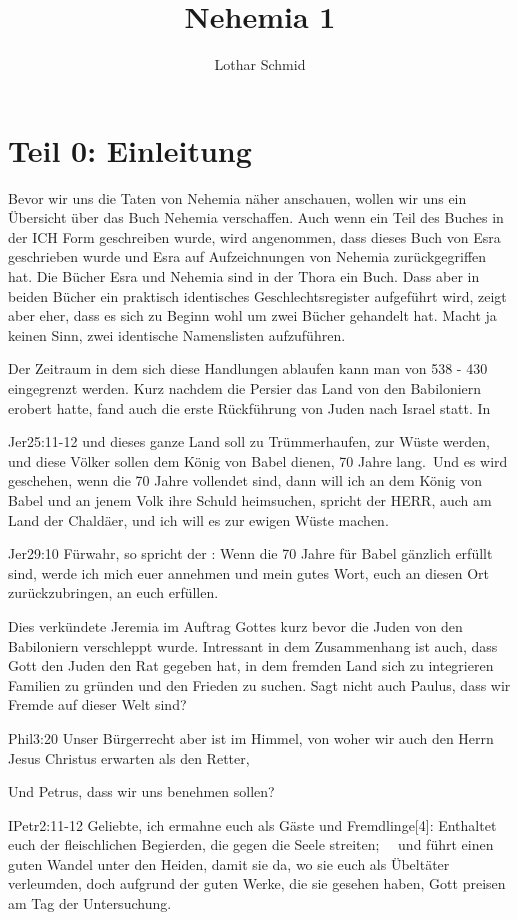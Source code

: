 \documentclass[fontsize=16pt]{mybib}
\title{Nehemia 1}
\author{Lothar Schmid}
\date{}
\begin{document}
\mytitlepage
\tableofcontents
\flushbottom
\newpage

\section{Teil 0: Einleitung}
Bevor wir uns die Taten von Nehemia näher anschauen, wollen wir uns ein Übersicht über das Buch Nehemia verschaffen. Auch wenn ein Teil des Buches in der ICH Form geschreiben wurde, wird angenommen, dass dieses Buch von Esra geschrieben wurde und Esra auf Aufzeichnungen von Nehemia zurückgegriffen hat. Die Bücher Esra und Nehemia sind in der Thora ein Buch. Dass aber in beiden Bücher ein praktisch identisches Geschlechtsregister aufgeführt wird, zeigt aber eher, dass es sich zu Beginn wohl um zwei Bücher gehandelt hat. Macht ja keinen Sinn, zwei identische Namenslisten aufzuführen.

Der Zeitraum in dem sich diese Handlungen ablaufen kann man von 538 - 430 \vChr eingegrenzt werden. Kurz nachdem die Persier das Land von den Babiloniern erobert hatte, fand auch die erste Rückführung von Juden nach Israel statt. In 
\begin{bibelbox}{Jer}{25:11-12}
    und dieses ganze Land soll zu Trümmerhaufen, zur Wüste werden, und diese Völker sollen dem König von Babel dienen, 70 Jahre lang. Und es wird geschehen, wenn die 70 Jahre vollendet sind, dann will ich an dem König von Babel und an jenem Volk ihre Schuld heimsuchen, spricht der HERR, auch am Land der Chaldäer, und ich will es zur ewigen Wüste machen.
\end{bibelbox}
\begin{bibelbox}{Jer}{29:10}
    Fürwahr, so spricht der \herr : Wenn die 70 Jahre für Babel gänzlich erfüllt sind, werde ich mich euer annehmen und mein gutes Wort, euch an diesen Ort zurückzubringen, an euch erfüllen.
\end{bibelbox}
Dies verkündete Jeremia im Auftrag Gottes kurz bevor die Juden von den Babiloniern verschleppt wurde. Intressant in dem Zusammenhang ist auch, dass Gott den Juden den Rat gegeben hat, in dem fremden Land sich zu integrieren Familien zu gründen und den Frieden zu suchen. Sagt nicht auch Paulus, dass wir Fremde auf dieser Welt sind? 
\begin{bibelbox}{Phil}{3:20}
    Unser Bürgerrecht aber ist im Himmel, von woher wir auch den Herrn Jesus Christus erwarten als den Retter, 
\end{bibelbox}
Und Petrus, dass wir uns benehmen sollen?
\begin{bibelbox}{IPetr}{2:11-12}
    Geliebte, ich ermahne euch als Gäste und Fremdlinge[4]: Enthaltet euch der fleischlichen Begierden, die gegen die Seele streiten; 
     und führt einen guten Wandel unter den Heiden, damit sie da, wo sie euch als Übeltäter verleumden, doch aufgrund der guten Werke, die sie gesehen haben, Gott preisen am Tag der Untersuchung.
\end{bibelbox}
\end{document}
